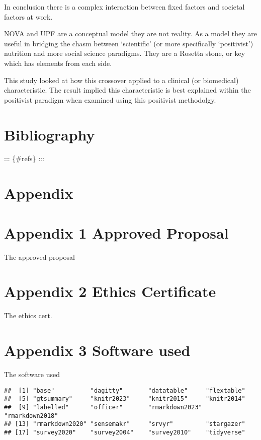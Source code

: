 \documentclass[
]{article}
\begin{document}
In conclusion there is a complex interaction between fixed factors and
societal factors at work.

NOVA and UPF are a conceptual model they are not reality. As a model
they are useful in bridging the chasm between `scientific' (or more
specifically `positivist') nutrition and more social science paradigms.
They are a Rosetta stone, or key which has elements from each side.

This study looked at how this crossover applied to a clinical (or
biomedical) characteristic. The result implied this characteristic is
best explained within the positivist paradigm when examined using this
positivist methodolgy.

\newpage

\hypertarget{bibliography}{%
\section{Bibliography}\label{bibliography}}

::: \{\#refs\} :::

\hypertarget{appendix}{%
\section*{Appendix}\label{appendix}}

\hypertarget{appendix-1-approved-proposal}{%
\section{Appendix 1 Approved
Proposal}\label{appendix-1-approved-proposal}}

The approved proposal

\hypertarget{appendix-2-ethics-certificate}{%
\section{Appendix 2 Ethics
Certificate}\label{appendix-2-ethics-certificate}}

The ethics cert.

\hypertarget{appendix-3-software-used}{%
\section{Appendix 3 Software used}\label{appendix-3-software-used}}

The software used

\begin{verbatim}
##  [1] "base"          "dagitty"       "datatable"     "flextable"    
##  [5] "gtsummary"     "knitr2023"     "knitr2015"     "knitr2014"    
##  [9] "labelled"      "officer"       "rmarkdown2023" "rmarkdown2018"
## [13] "rmarkdown2020" "sensemakr"     "srvyr"         "stargazer"    
## [17] "survey2020"    "survey2004"    "survey2010"    "tidyverse"
\end{verbatim}
\end{document}
